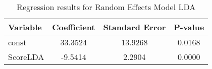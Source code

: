\begin{table}[htbp]
\centering
\caption{Regression results for Random Effects Model LDA}
\begin{tabular}{lccc}
\hline
Variable & Coefficient & Standard Error & P-value \\ 
\hline
const & 33.3524 & 13.9268 & 0.0168 \\ 
ScoreLDA & -9.5414 & 2.2904 & 0.0000 \\ 
\hline
\end{tabular}
\end{table}

